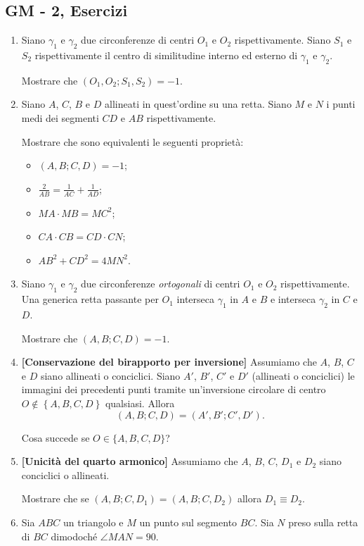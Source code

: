 \subsection{GM - 2, Esercizi}
\begin{enumerate}
	\item Siano $\gamma_1$ e $\gamma_2$ due circonferenze di centri $O_1$ e $O_2$ rispettivamente. Siano $S_1$ e $S_2$ rispettivamente il centro di similitudine interno ed esterno di $\gamma_1$ e $\gamma_2$.
	
	Mostrare che $(O_1,O_2;S_1,S_2)=-1$.
	\item Siano $A$, $C$, $B$ e $D$ allineati in quest'ordine su una retta. Siano $M$ e $N$ i punti medi dei segmenti
	$CD$ e $AB$ rispettivamente. 
	
	Mostrare che sono equivalenti le seguenti proprietà:
	\begin{itemize}
		\item $(A,B;C,D)=-1$;
		\item $\displaystyle\frac{2}{AB}=\displaystyle\frac{1}{AC}+
		\displaystyle\frac{1}{AD}$;
		\item $MA\cdot MB=MC^2$;
		\item $CA\cdot CB=CD\cdot CN$;
		\item $AB^2+CD^2=4MN^2$.
	\end{itemize}
	\item Siano $\gamma_1$ e $\gamma_2$ due circonferenze \textit{ortogonali} di centri $O_1$ e $O_2$ rispettivamente. Una generica retta passante per $O_1$ interseca $\gamma_1$ in $A$ e $B$ e interseca $\gamma_2$ in $C$ e $D$.
	
	Mostrare che $(A,B;C,D)=-1$.
	\item \textbf{[Conservazione del birapporto per inversione]} Assumiamo che $A$, $B$, $C$ e $D$ siano allineati o conciclici. Siano $A'$, $B'$, $C'$ e $D'$ (allineati o conciclici) le immagini dei precedenti punti tramite un'inversione circolare di centro $O\notin\left\{A,B,C,D\right\}$  qualsiasi. Allora
	\begin{equation}
	(A,B;C,D)=(A',B';C',D').
	\end{equation}
	
	Cosa succede se $O\in \{A,B,C,D\}$?
	\item \textbf{[Unicità del quarto armonico]}
	Assumiamo che $A$, $B$, $C$, $D_1$ e $D_2$ siano conciclici o allineati.
	
	Mostrare che se $(A,B;C,D_1)=(A,B;C,D_2)$ allora $D_1 \equiv D_2$.
	
    \item Sia $ABC$ un triangolo e $M$ un punto sul segmento $BC$. Sia $N$ preso sulla retta di $BC$ dimodoché $\angle MAN=90$.
    

\end{enumerate}
